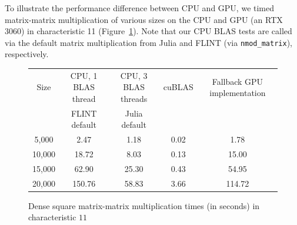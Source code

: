 To illustrate the performance difference between CPU and GPU, we timed
matrix-matrix multiplication of various sizes on the CPU and GPU (an RTX 3060) in
characteristic 11 (Figure~\ref{fig:matmul:compare}).
Note that our CPU BLAS tests are called via the default matrix multiplication from Julia and FLINT
(via \texttt{nmod\_matrix}), respectively.

\begin{figure}[h]
\begin{center}
\begin{tabular}{c c c c c}
    \toprule
    Size &
    CPU, 1 BLAS thread &
    CPU, 3 BLAS threads &
    cuBLAS &
    Fallback GPU implementation \\
           & FLINT default & Julia default & & \\
    \midrule
    5,000  & 2.47   & 1.18  & 0.02 & 1.78   \\
    10,000 & 18.72  & 8.03  & 0.13 & 15.00  \\
    15,000 & 62.90  & 25.30 & 0.43 & 54.95  \\
    20,000 & 150.76 & 58.83 & 3.66 & 114.72 \\
    \bottomrule
\end{tabular}
\caption{Dense square matrix-matrix multiplication times (in seconds) in characteristic $11$}
\label{fig:matmul:compare}
\end{center}
\end{figure}
